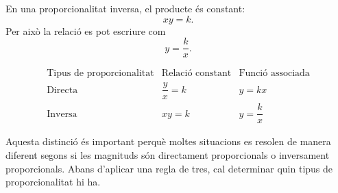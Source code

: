 En una proporcionalitat inversa, el producte és constant:
\[
	xy=k.
\]
Per això la relació es pot escriure com
\[
	y=\frac{k}{x}.
\]

\[
\begin{array}{c|c|c}
\text{Tipus de proporcionalitat} & \text{Relació constant} & \text{Funció associada}\\
\hline
\text{Directa} & \dfrac{y}{x}=k & y=kx\\[1.2em]
\text{Inversa} & xy=k & y=\dfrac{k}{x}
\end{array}
\]

Aquesta distinció és important perquè moltes situacions es resolen de manera diferent segons si les magnituds són directament proporcionals o inversament proporcionals. Abans d'aplicar una regla de tres, cal determinar quin tipus de proporcionalitat hi ha. 